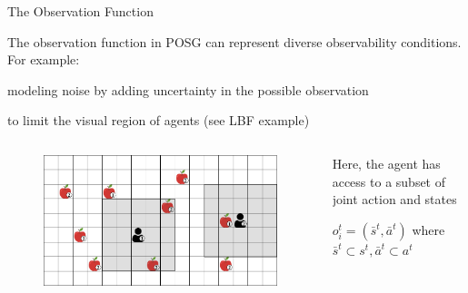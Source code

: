 \begin{frame}{The Observation Function}

The observation function in POSG can represent diverse observability conditions. For example:
\blist
    \item modeling noise by adding uncertainty in the possible observation
    \item to limit the visual region of agents (see LBF example)
\elist

\begin{columns}
    \begin{column}{0.5\textwidth}
    \begin{figure}
        \centering
        \includegraphics[width = 0.8\linewidth, keepaspectratio]{images/environments/lbf/foraging_po.png}
    \end{figure}
        
    \end{column}
    \begin{column}{0.5\textwidth}
        \blist 

            \item Here, the agent has access to a subset of joint action and states
            \item \(o^{t}_{i} = (\bar{s}^t, \bar{a}^t)\) where \(\bar{s}^t \subset s^t, \bar{a}^t \subset a^t\)
        \elist
    \end{column}
\end{columns}    
\end{frame}

